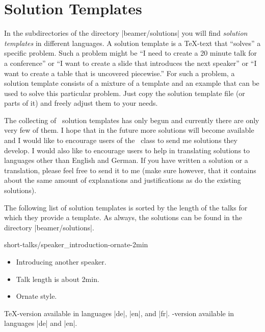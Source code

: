 %
%
%


\section{Solution Templates}
\label{section-solutions}

In the subdirectories of the directory |beamer/solutions| you will
find \emph{solution templates} in different languages. A solution
template is a \TeX-text that ``solves'' a specific problem. Such a
problem might be ``I need to create a 20 minute talk for a
conference'' or ``I want to create a slide that introduces the next
speaker'' or ``I want to create a table that is uncovered piecewise.''
For such a problem, a solution template consists of a mixture of a
template and an example that can be used to solve this particular
problem. Just copy the solution template file (or parts of it) and
freely adjust them to your needs.

The collecting of \beamer\ solution templates has only begun and
currently there are only very few of them. I hope that in the future
more solutions will become available and I would like to encourage
users of the \beamer\ class to send me solutions they develop. I would
also like to encourage users to help in translating solutions to
languages other than English and German. If you have written a
solution or a translation, please feel free to send it to me (make
sure however, that it contains about the same amount of explanations
and justifications as do the existing solutions).

The following list of solution templates is sorted by the length of
the talks for which they provide a template. As always, the solutions
can be found in the directory |beamer/solutions|.


\begin{solution}{short-talks/speaker\_introduction-ornate-2min}
  \begin{itemize}
  \item
    Introducing another speaker.
  \item
    Talk length is about 2min.
  \item
    Ornate style.
  \end{itemize}
  \beamernote \TeX-version available in languages |de|, |en|, and |fr|.
  \lyxnote    \LyX-version available in languages |de| and |en|.
\end{solution}

